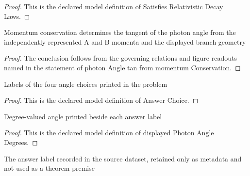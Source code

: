 \begin{proof}
  This is the declared model definition of Satisfies Relativistic Decay Laws.
\end{proof}
\begin{lemma}
  \label{lem:physics:phyx-mini-0556:phyxminiproblems-problemphyxmini0556-photonangle-tan-from-momentumconservation}
  Momentum conservation determines the tangent of the photon angle from the independently represented A and B momenta and the displayed branch geometry
\end{lemma}
\begin{proof}
  The conclusion follows from the governing relations and figure readouts named in the statement of photon Angle tan from momentum Conservation.
\end{proof}
\begin{definition}
  \label{def:physics:phyx-mini-0556:phyxminiproblems-problemphyxmini0556-answerchoice}
  Labels of the four angle choices printed in the problem
\end{definition}
\begin{proof}
  This is the declared model definition of Answer Choice.
\end{proof}
\begin{definition}
  \label{def:physics:phyx-mini-0556:phyxminiproblems-problemphyxmini0556-displayedphotonangledegrees}
  Degree-valued angle printed beside each answer label
\end{definition}
\begin{proof}
  This is the declared model definition of displayed Photon Angle Degrees.
\end{proof}
\begin{definition}
  \label{def:physics:phyx-mini-0556:phyxminiproblems-problemphyxmini0556-recordeddatasetanswer}
  The answer label recorded in the source dataset, retained only as metadata and not used as a theorem premise
\end{definition}
